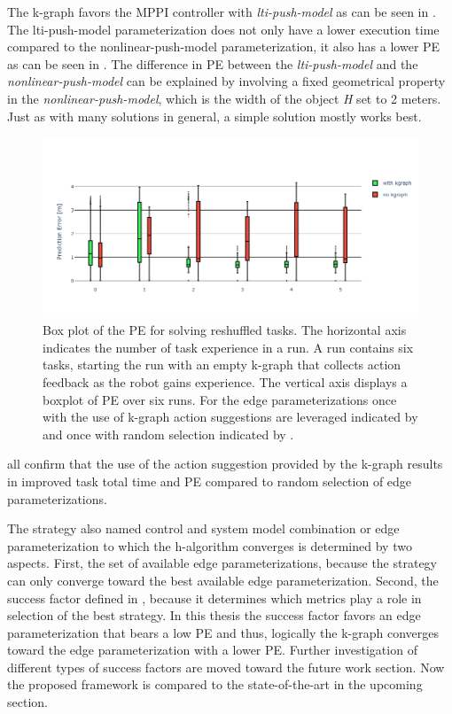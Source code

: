 The \ac{k-graph} favors the \ac{MPPI} controller with \textit{lti-push-model} as can be seen in . The lti-push-model parameterization does not only have a lower execution time compared to the nonlinear-push-model parameterization, it also has a lower \ac{PE} as can be seen in . The difference in \ac{PE} between the \textit{lti-push-model} and the \textit{nonlinear-push-model} can be explained by involving a fixed geometrical property in the \textit{nonlinear-push-model}, which is the width of the object \textit{H} set to 2 meters. Just as with many solutions in general, a simple solution mostly works best.\bs

\begin{figure}[H]
    \centering
    \includegraphics[width=\textwidth]{figures/results/random_push_pe_vs}
    \caption{Box plot of the \acl{PE} for solving reshuffled tasks. The horizontal axis indicates the number of task experience in a run. A run contains six tasks, starting the run with an empty \ac{k-graph} that collects action feedback as the robot gains experience. The vertical axis displays a boxplot of \acl{PE} over six runs. For the edge parameterizations once with the use of \ac{k-graph} action suggestions are leveraged indicated by  and once with random selection indicated by .}%
    \label{fig:random_push_pe_vs}
\end{figure}

 all confirm that the use of the action suggestion provided by the \ac{k-graph} results in improved task total time and \ac{PE} compared to random selection of edge parameterizations. 

The strategy also named control and system model combination or edge parameterization to which the \ac{h-algorithm} converges is determined by two aspects. First, the set of available edge parameterizations, because the strategy can only converge toward the best available edge parameterization. Second, the success factor defined in , because it determines which metrics play a role in selection of the best strategy. In this thesis the success factor favors an edge parameterization that bears a low \ac{PE} and thus, logically the \ac{k-graph} converges toward the edge parameterization with a lower \ac{PE}. Further investigation of different types of success factors are moved toward the future work section. Now the proposed framework is compared to the state-of-the-art in the upcoming section.\bs

